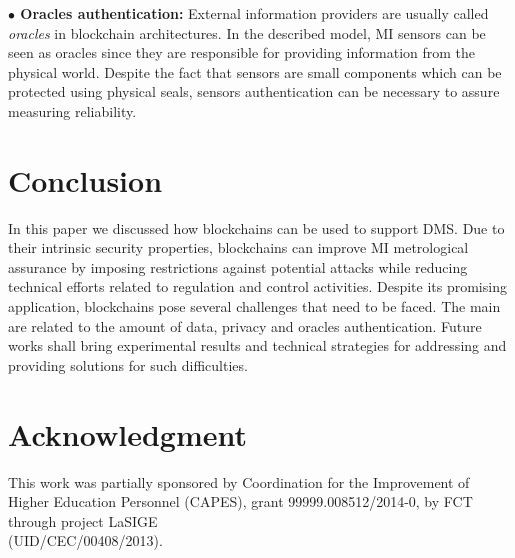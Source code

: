 \documentclass[conference]{IEEEtran}
\begin{document}
\textbf{$\bullet$ Oracles authentication:} External information providers are usually called \emph{oracles} in blockchain architectures. In the described model, MI sensors can be seen as oracles since they are responsible for providing information from the physical world. Despite the fact that sensors are small components which can be protected using physical seals, sensors authentication can be necessary to assure measuring reliability.


\section{Conclusion}
In this paper we discussed how blockchains can be used to support DMS. Due to their intrinsic security properties, blockchains can improve MI metrological assurance by imposing restrictions against potential attacks while reducing technical efforts related to regulation and control activities. Despite its promising application, blockchains pose several challenges that need to be faced. The main are related to the amount of data, privacy and oracles authentication. Future works shall bring experimental results and technical strategies for addressing and providing solutions for such difficulties.


\section*{Acknowledgment}
This work was partially sponsored by Coordination for the Improvement of Higher Education Personnel (CAPES), grant 99999.008512/2014-0, by FCT through project LaSIGE\\ (UID/CEC/00408/2013).
\end{document}
